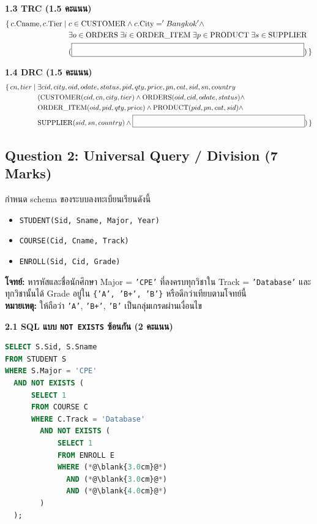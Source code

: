 \documentclass[a4paper,12pt]{article}
\newcommand{\blank}[1]{\fbox{\rule{0pt}{1.1em}\hspace{#1}}}
\begin{document}
\vspace{0.1cm}
\textbf{1.3 TRC (1.5 คะแนน)}
\[
\begin{aligned}
\{\, c.\text{Cname}, c.\text{Tier} \mid\;& c \in \text{CUSTOMER} \land c.\text{City}='Bangkok' \land\\
&\exists o \in \text{ORDERS}\;
\exists i \in \text{ORDER\_ITEM}\;
\exists p \in \text{PRODUCT}\;
\exists s \in \text{SUPPLIER}\\
&(\blank{10.5cm}) \,\}
\end{aligned}
\]

\vspace{0.1cm}
\textbf{1.4 DRC (1.5 คะแนน)}
\[
\begin{aligned}
\{\, cn,tier \mid\;& \exists cid,city,oid,odate,status,pid,qty,price,pn,cat,sid,sn,country\\
&(\text{CUSTOMER}(cid,cn,city,tier) \land
\text{ORDERS}(oid,cid,odate,status) \land\\
&\text{ORDER\_ITEM}(oid,pid,qty,price) \land
\text{PRODUCT}(pid,pn,cat,sid) \land\\
&\text{SUPPLIER}(sid,sn,country) \land \blank{8.5cm}) \,\}
\end{aligned}
\]

\newpage
\subsection*{Question 2: Universal Query / Division (7 Marks)}
กำหนด schema ของระบบลงทะเบียนเรียนดังนี้
\begin{itemize}
    \item \texttt{STUDENT(Sid, Sname, Major, Year)}
    \item \texttt{COURSE(Cid, Cname, Track)}
    \item \texttt{ENROLL(Sid, Cid, Grade)}
\end{itemize}

\noindent\textbf{โจทย์:} หารหัสและชื่อนักศึกษา Major = \texttt{'CPE'} ที่ลงครบทุกวิชาใน Track = \texttt{'Database'} และทุกวิชานั้นได้ Grade อยู่ใน \texttt{\{'A', 'B+', 'B'\}} หรือดีกว่าเทียบตามโจทย์นี้\\
\textbf{หมายเหตุ:} ให้ถือว่า \texttt{'A'}, \texttt{'B+'}, \texttt{'B'} เป็นกลุ่มเกรดผ่านเงื่อนไข

\vspace{0.2cm}
\textbf{2.1 SQL แบบ \texttt{NOT EXISTS} ซ้อนกัน (2 คะแนน)}
\begin{lstlisting}[language=SQL]
SELECT S.Sid, S.Sname
FROM STUDENT S
WHERE S.Major = 'CPE'
  AND NOT EXISTS (
      SELECT 1
      FROM COURSE C
      WHERE C.Track = 'Database'
        AND NOT EXISTS (
            SELECT 1
            FROM ENROLL E
            WHERE (*@\blank{3.0cm}@*)
              AND (*@\blank{3.0cm}@*)
              AND (*@\blank{4.0cm}@*)
        )
  );
\end{lstlisting}
\end{document}
